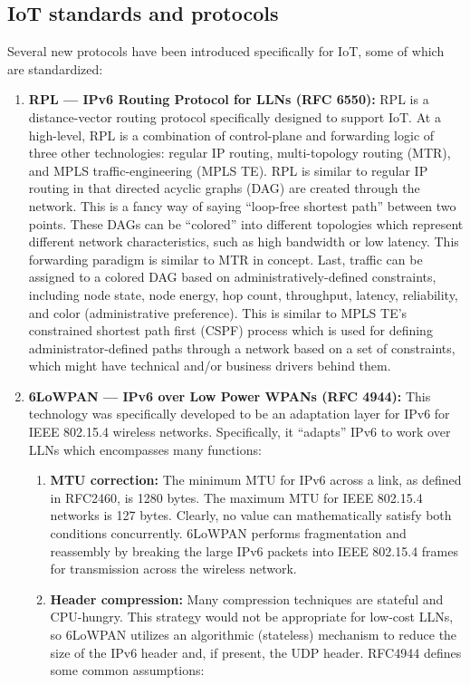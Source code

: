 \subsection{IoT standards and protocols}
Several new protocols have been introduced specifically for IoT, some of which
are standardized:

\begin{enumerate}
  \item \textbf{RPL --- IPv6 Routing Protocol for LLNs (RFC 6550):} RPL is a
  distance-vector routing protocol specifically designed to support IoT. At a
  high-level, RPL is a combination of control-plane and forwarding logic of
  three other technologies: regular IP routing, multi-topology routing (MTR),
  and MPLS traffic-engineering (MPLS TE). RPL is similar to regular IP routing
  in that directed acyclic graphs (DAG) are created through the network. This
  is a fancy way of saying ``loop-free shortest path'' between two points.
  These DAGs can be ``colored'' into different topologies which represent
  different network characteristics, such as high bandwidth or low latency.
  This forwarding paradigm is similar to MTR in concept. Last, traffic can be
  assigned to a colored DAG based on administratively-defined constraints,
  including node state, node energy, hop count, throughput, latency,
  reliability, and color (administrative preference). This is similar to MPLS
  TE’s constrained shortest path first (CSPF) process which is used for
  defining administrator-defined paths through a network based on a set of
  constraints, which might have technical and/or business drivers behind them.
  \item \textbf{6LoWPAN --- IPv6 over Low Power WPANs (RFC 4944):} This
  technology was specifically developed to be an adaptation layer for IPv6 for
  IEEE 802.15.4 wireless networks. Specifically, it ``adapts'' IPv6 to work
  over LLNs which encompasses many functions:

  \begin{enumerate}
    \item \textbf{MTU correction:} The minimum MTU for IPv6 across a link, as
	defined in RFC2460, is 1280 bytes. The maximum MTU for IEEE 802.15.4 networks
	is 127 bytes. Clearly, no value can mathematically satisfy both conditions
	concurrently. 6LoWPAN performs fragmentation and reassembly by breaking the
	large IPv6 packets into IEEE 802.15.4 frames for transmission across the
	wireless network.
    \item \textbf{Header compression:} Many compression techniques are
	stateful and CPU-hungry. This strategy would not be appropriate for low-cost
	LLNs, so 6LoWPAN utilizes an algorithmic (stateless) mechanism to reduce the
	size of the IPv6 header and, if present, the UDP header. RFC4944 defines some
	common assumptions:


\end{enumerate}
\end{enumerate}
